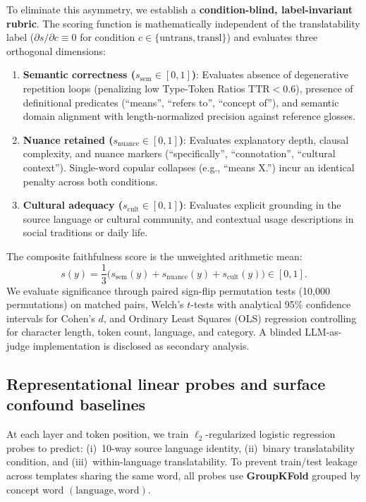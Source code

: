 \documentclass{article}
\begin{document}
To eliminate this asymmetry, we establish a \textbf{condition-blind, label-invariant rubric}. The scoring function is mathematically independent of the translatability label ($\partial s / \partial c \equiv 0$ for condition $c \in \{\text{untrans}, \text{transl}\}$) and evaluates three orthogonal dimensions:
\begin{enumerate}
    \item \textbf{Semantic correctness ($s_{\mathrm{sem}} \in [0,1]$)}: Evaluates absence of degenerative repetition loops (penalizing low Type-Token Ratios $\text{TTR} < 0.6$), presence of definitional predicates (``means'', ``refers to'', ``concept of''), and semantic domain alignment with length-normalized precision against reference glosses.
    \item \textbf{Nuance retained ($s_{\mathrm{nuance}} \in [0,1]$)}: Evaluates explanatory depth, clausal complexity, and nuance markers (``specifically'', ``connotation'', ``cultural context''). Single-word copular collapses (e.g., ``means X.'') incur an identical penalty across both conditions.
    \item \textbf{Cultural adequacy ($s_{\mathrm{cult}} \in [0,1]$)}: Evaluates explicit grounding in the source language or cultural community, and contextual usage descriptions in social traditions or daily life.
\end{enumerate}
The composite faithfulness score is the unweighted arithmetic mean:
\begin{equation}
s(y) = \frac{1}{3}\bigl(s_{\mathrm{sem}}(y) + s_{\mathrm{nuance}}(y) + s_{\mathrm{cult}}(y)\bigr) \in [0, 1].
\label{eq:faith_blind}
\end{equation}
We evaluate significance through paired sign-flip permutation tests (10,000 permutations) on matched pairs, Welch's $t$-tests with analytical 95\% confidence intervals for Cohen's $d$, and Ordinary Least Squares (OLS) regression controlling for character length, token count, language, and category. A blinded LLM-as-judge implementation is disclosed as secondary analysis.

\subsection{Representational linear probes and surface confound baselines}

At each layer and token position, we train $\ell_2$-regularized logistic regression probes to predict: (i)~10-way source language identity, (ii)~binary translatability condition, and (iii)~within-language translatability. To prevent train/test leakage across templates sharing the same word, all probes use \textbf{GroupKFold} grouped by concept word $(\text{language}, \text{word})$.
\end{document}
